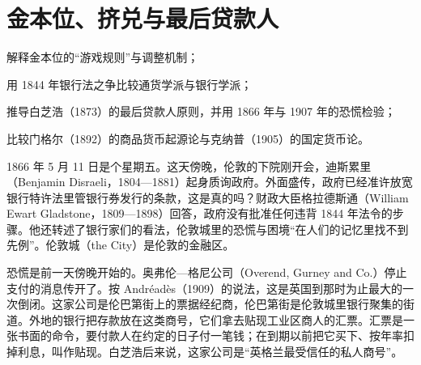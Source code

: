\chapter{金本位、挤兑与最后贷款人}\label{ch:goldstandard}

\begin{chapterguide}
\begin{guidegoals}
\item 解释金本位的“游戏规则”与调整机制；
\item 用 1844 年银行法之争比较通货学派与银行学派；
\item 推导白芝浩（1873）的最后贷款人原则，并用 1866 年与 1907 年的恐慌检验；
\item 比较门格尔（1892）的商品货币起源论与克纳普（1905）的国定货币论。
\end{guidegoals}
\end{chapterguide}

1866 年 5 月 11 日是个星期五。这天傍晚，伦敦的下院刚开会，迪斯累里（Benjamin Disraeli，1804—1881）起身质询政府。外面盛传，政府已经准许放宽银行特许法里管银行券发行的条款，这是真的吗\cite{hansard1866,hansardpeople}？财政大臣格拉德斯通（William Ewart Gladstone，1809—1898）回答，政府没有批准任何违背 1844 年法令的步骤\cite{hansard1866,hansardpeople}。他还转述了银行家们的看法，伦敦城里的恐慌与困境“在人们的记忆里找不到先例”\cite{hansard1866}。伦敦城（the City）是伦敦的金融区。

恐慌是前一天傍晚开始的。奥弗伦—格尼公司（Overend, Gurney and Co.）停止支付的消息传开了。按 Andréadès（1909）的说法，这是英国到那时为止最大的一次倒闭\cite{andreades1909}。这家公司是伦巴第街上的票据经纪商，伦巴第街是伦敦城里银行聚集的街道。外地的银行把存款放在这类商号，它们拿去贴现工业区商人的汇票\cite{bagehot1873}。汇票是一张书面的命令，要付款人在约定的日子付一笔钱；在到期以前把它买下、按年率扣掉利息，叫作贴现。白芝浩后来说，这家公司是“英格兰最受信任的私人商号”\cite{bagehot1873}。

